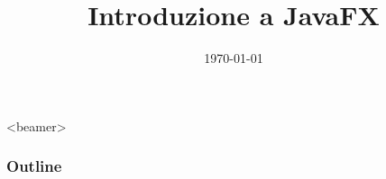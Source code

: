 \documentclass[xcolor=dvipsnames,presentation]{beamer}
\title[{\lab} -- JavaFX]{Introduzione a JavaFX}
\date[\today]{\today}
\begin{document}
\frame[label=coverpage]{\titlepage}

\begin{frame}<beamer>
 	\frametitle{Outline}
 	\tableofcontents[]
\end{frame}


%
\end{document}
